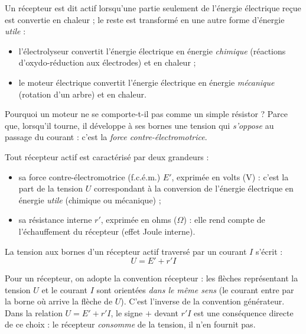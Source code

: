 \documentclass[11pt]{article}
\newcommand{\cle}[1]{{\popxbold\color{popdark}#1}}
\begin{document}
\begin{definition}
Un récepteur est dit \cle{actif} lorsqu'une partie seulement de l'énergie électrique reçue est convertie en chaleur ; le reste est transformé en une autre forme d'énergie \emph{utile} :
\begin{itemize}
\item l'\cle{électrolyseur} convertit l'énergie électrique en énergie \emph{chimique} (réactions d'oxydo-réduction aux électrodes) et en chaleur ;
\item le \cle{moteur électrique} convertit l'énergie électrique en énergie \emph{mécanique} (rotation d'un arbre) et en chaleur.
\end{itemize}
\end{definition}

Pourquoi un moteur ne se comporte-t-il pas comme un simple résistor ? Parce que, lorsqu'il tourne, il développe à ses bornes une tension qui \emph{s'oppose} au passage du courant : c'est la \emph{force contre-électromotrice}.

\begin{definition}
Tout récepteur actif est caractérisé par deux grandeurs :
\begin{itemize}
\item sa \cle{force contre-électromotrice} (f.c.é.m.) $E'$, exprimée en volts (V) : c'est la part de la tension $U$ correspondant à la conversion de l'énergie électrique en énergie \emph{utile} (chimique ou mécanique) ;
\item sa \cle{résistance interne} $r'$, exprimée en ohms ($\Omega$) : elle rend compte de l'échauffement du récepteur (effet Joule interne).
\end{itemize}
La tension aux bornes d'un récepteur actif traversé par un courant $I$ s'écrit :
\[ U = E' + r'I \]
\end{definition}

\begin{attention}
Pour un récepteur, on adopte la \cle{convention récepteur} : les flèches représentant la tension $U$ et le courant $I$ sont orientées \emph{dans le même sens} (le courant entre par la borne où arrive la flèche de $U$). C'est l'inverse de la convention générateur. Dans la relation $U = E' + r'I$, le signe $+$ devant $r'I$ est une conséquence directe de ce choix : le récepteur \emph{consomme} de la tension, il n'en fournit pas.
\end{attention}
\end{document}
